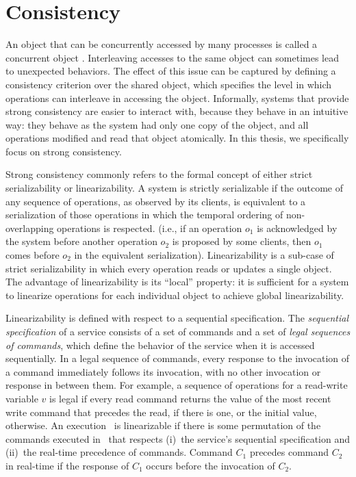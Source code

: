 \section{Consistency}
An object that can be concurrently accessed by many processes is called a
concurrent object \cite{linearizability}. Interleaving accesses to the same
object can sometimes lead to unexpected behaviors. The effect of this issue can
be captured by defining a consistency criterion over the shared object, which
specifies the level in which operations can interleave in accessing the object.
Informally, systems that provide strong consistency are easier to interact with,
because they behave in an intuitive way: they behave as the system had only one
copy of the object, and all operations modified and read that object atomically.
In this thesis, we specifically focus on strong consistency.

Strong consistency commonly refers to the formal concept of either strict
serializability or linearizability. A system is strictly serializable if the
outcome of any sequence of operations, as observed by its clients, is equivalent
to a serialization of those operations in which the temporal ordering of
non-overlapping operations is respected. (i.e., if an operation \emph{$o_1$} is
acknowledged by the system before another operation \emph{$o_2$} is proposed by
some clients, then \emph{$o_1$} comes before \emph{$o_2$} in the equivalent
serialization). Linearizability is a sub-case of strict serializability in which
every operation reads or updates a single object. The advantage of
linearizability is its ``local'' property: it is sufficient for a system to
linearize operations for each individual object to achieve global
linearizability.

Linearizability is defined with respect to a sequential
specification. The \emph{sequential specification} of a service consists of a
set of commands and a set of \emph{legal sequences of commands}, which define
the behavior of the service when it is accessed sequentially. In a legal
sequence of commands, every response to the invocation of a command immediately
follows its invocation, with no other invocation or response in between them.
For example, a sequence of operations for a read-write variable $v$ is legal if
every read command returns the value of the most recent write command that
precedes the read, if there is one, or the initial value, otherwise. An
execution \ex\ is linearizable if there is some permutation of the commands
executed in \ex\ that respects (i)~the service's sequential specification and
(ii)~the real-time precedence of commands. Command $C_1$ precedes command $C_2$
in real-time if the response of $C_1$ occurs before the invocation of $C_2$.


